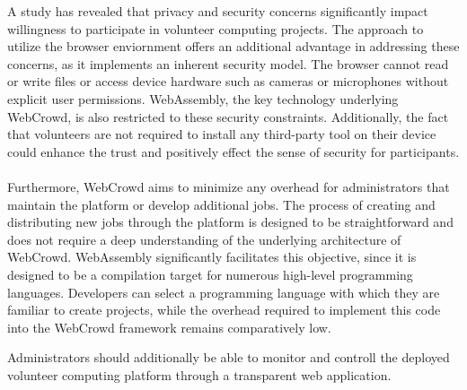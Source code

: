 A study has revealed that privacy and security concerns significantly impact willingness to participate in volunteer computing projects. \cite{intro:volunteerStudy} The approach to utilize the browser enviornment offers an additional advantage in addressing these concerns, as it implements an inherent security model. The browser cannot read or write files or access device hardware such as cameras or microphones without explicit user permissions. WebAssembly, the key technology underlying WebCrowd, is also restricted to these security constraints. Additionally, the fact that volunteers are not required to install any third-party tool on their device could enhance the trust and positively effect the sense of security for participants.
\\~\\
Furthermore, WebCrowd aims to minimize any overhead for administrators that maintain the platform or develop additional jobs. The process of creating and distributing new jobs through the platform is designed to be straightforward and does not require a deep understanding of the underlying architecture of WebCrowd. WebAssembly significantly facilitates this objective, since it is designed to be a compilation target for numerous high-level programming languages. \cite{methodology:wasm,methodology:wasmdocu, relatedwork:wasmedgecomputing} Developers can select a programming language with which they are familiar to create projects, while the overhead required to implement this code into the WebCrowd framework remains comparatively low. 

Administrators should additionally be able to monitor and controll the deployed volunteer computing platform through a transparent web application.


